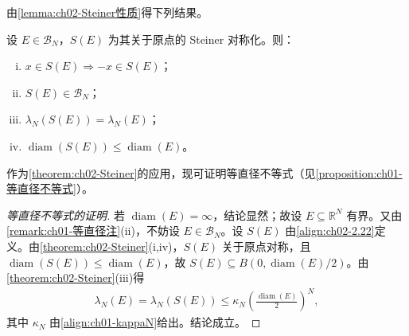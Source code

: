 \documentclass[../../main.tex]{subfiles}%
\begin{document}
由\cref{lemma:ch02-Steiner性质}得下列结果。

\begin{theorem}\label{theorem:ch02-Steiner}
设 $E\in\mathscr B_N$，$S(E)$ 为其关于原点的 Steiner 对称化。则：
\begin{enumerate}[(i)]
\item $x\in S(E)\Rightarrow-x\in S(E)$；
\item $S(E)\in\mathscr B_N$；
\item $\lambda_N(S(E))=\lambda_N(E)$；
\item $\operatorname{diam}(S(E))\leqslant\operatorname{diam}(E)$。
\end{enumerate}
\end{theorem}

作为\cref{theorem:ch02-Steiner}的应用，现可证明等直径不等式（见\cref{proposition:ch01-等直径不等式}）。

\begin{proof}[等直径不等式的证明]
若 $\operatorname{diam}(E)=\infty$，结论显然；故设 $E\subseteq\mathbb R^N$ 有界。又由\cref{remark:ch01-等直径注}(ii)，不妨设 $E\in\mathscr B_N$。设 $S(E)$ 由\eqref{align:ch02-2.22}定义。由\cref{theorem:ch02-Steiner}(i,iv)，$S(E)$ 关于原点对称，且 $\operatorname{diam}(S(E))\leqslant\operatorname{diam}(E)$，故 $S(E)\subseteq B(0,\operatorname{diam}(E)/2)$。由\cref{theorem:ch02-Steiner}(iii)得
\begin{align*}
\lambda_N(E)=\lambda_N(S(E))\leqslant\kappa_N\left(\frac{\operatorname{diam}(E)}2\right)^N,
\end{align*}
其中 $\kappa_N$ 由\eqref{align:ch01-kappaN}给出。结论成立。
\end{proof}
\end{document}
